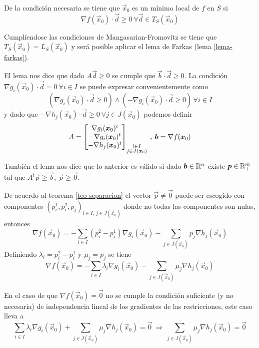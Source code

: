 \begin{demostracion} De la condici\'on necesaria se tiene que $\vec{x}_0$ es un m\'inimo local de $f$ en $S$ si
$$\nabla f(\vec{x}_0)\cdot \vec{d} \geq 0 \:\forall \vec{d}\in T_S(\vec{x}_0)$$

Cumpl\'iendose las condiciones de Mangasarian-Fromovitz se tiene que $T_S(\vec{x}_0)=L_S(\vec{x}_0)$ y ser\'a posible aplicar el lema de Farkas (lema \ref{lema-farkas}).

El lema nos dice que dado $A\vec{d} \geq 0$ se cumple que $\vec{b}\cdot \vec{d} \geq 0$. La condici\'on $\nabla g_i(\vec{x}_0) \cdot \vec{d} = 0 \:\forall i\in I$ se puede expresar convenientemente como
$$(\nabla g_i(\vec{x}_0) \cdot \vec{d} \geq 0) \wedge (-\nabla g_i(\vec{x}_0) \cdot \vec{d} \geq 0) \, \forall i\in I $$
y dado que $-\nabla h_j(\vec{x}_0)\cdot \vec{d} \geq 0\:\forall j\in J(\vec{x}_0)$ podemos definir
$$A =
\begin{bmatrix}
\nabla g_i(\vec{x}_0)^t \cr
-\nabla g_i(\vec{x}_0)^t \cr
-\nabla h_j(\vec{x}_0)^t 
\end{bmatrix}_{\substack{i\in I\\j\in J(\vec{x}_0)}}  \:,\: \vec{b}=\nabla f(\vec{x}_0)$$ 

Tambi\'en el lema nos dice que lo anterior es v\'alido si dado $\vec{b} \in \R^n$  existe $\vec{p}\in \R^m_+$ tal que
$A^t \vec{p} \geq \vec{b},\: \vec{p}\geq \vec{0}$.

De acuerdo al teorema \ref{teo-separacion} el vector $\vec{p}\neq \vec{0}$ puede ser escogido con componentes $(p^1_i,p^2_i,p_j)_{i\in I,\:j\in J(\vec{x}_0)}$ donde no todas las componentes son nulas, entonces
$$\nabla f(\vec{x}_0) = -\sum_{i\in I} (p^2_i-p^1_i) \nabla g_i(\vec{x}_0) - \sum_{j\in J(\vec{x}_0)} p_j \nabla h_j(\vec{x}_0) $$
Definiendo $\lambda_i = p^2_i-p^1_i$ y $\mu_j = p_j$ se tiene
$$\nabla f(\vec{x}_0) = -\sum_{i\in I} \lambda_i \nabla g_i(\vec{x}_0) - \sum_{j\in J(\vec{x}_0)} \mu_j \nabla h_j(\vec{x}_0)$$

En el caso de que $\nabla f(\vec{x}_0) = \vec{0}$ no se cumple la condici\'on suficiente (y no necesaria) de independencia lineal de los gradientes de las restricciones, este caso lleva a
$$\sum_{i\in I} \lambda_i \nabla g_i(\vec{x}_0) + \sum_{j\in J(\vec{x}_0)} \mu_j \nabla h_j(\vec{x}_0) = \vec{0} \:\Rightarrow\: \sum_{j\in J(\vec{x}_0)} \mu_j \nabla h_j(\vec{x}_0) = \vec{0}$$


\end{demostracion}
